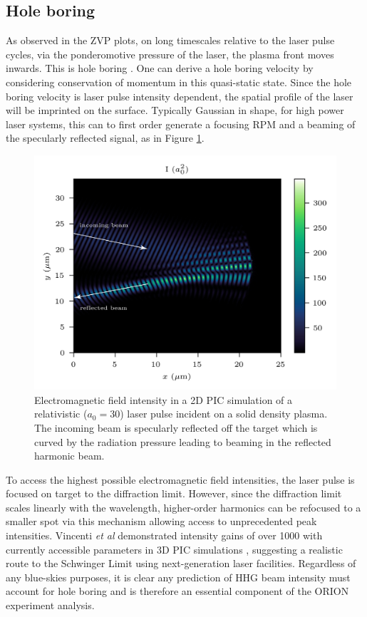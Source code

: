 \subsection{Hole boring}
As observed in the ZVP plots, on long timescales relative to the laser pulse cycles, via the ponderomotive pressure of the laser, the plasma front moves inwards. This is hole boring \cite{wilksAbsorptionUltraIntenseLaser1992}. One can derive a hole boring velocity by considering conservation of momentum in this quasi-static state. Since the hole boring velocity is laser pulse intensity dependent, the spatial profile of the laser will be imprinted on the surface. Typically Gaussian in shape, for high power laser systems, this can to first order generate a focusing \ac{RPM} and a beaming of the specularly reflected signal, as in Figure \ref{fig:orionholeboring}.
\begin{figure}
	\centering
	\includegraphics[width=0.9\linewidth]{figures/orion/orion_hole_boring}
	\caption[2D PIC simulation of HHG beaming effect via hole boring.]{Electromagnetic field intensity in a 2D PIC simulation of a relativistic ($a_0 = 30$) laser pulse incident on a solid density plasma. The incoming beam is specularly reflected off the target which is curved by the radiation pressure leading to beaming in the reflected harmonic beam.}
	\label{fig:orionholeboring}
\end{figure}
To access the highest possible electromagnetic field intensities, the laser pulse is focused on target to the diffraction limit. However, since the diffraction limit scales linearly with the wavelength, higher-order harmonics can be refocused to a smaller spot via this mechanism allowing access to unprecedented peak intensities. Vincenti \textit{et al} demonstrated intensity gains of over 1000 with currently accessible parameters in \ac{3D} \ac{PIC} simulations \cite{vincentiAchievingExtremeLight2019}, suggesting a realistic route to the Schwinger Limit using next-generation laser facilities. Regardless of any blue-skies purposes, it is clear any prediction of \ac{HHG} beam intensity must account for hole boring and is therefore an essential component of the ORION experiment analysis.

